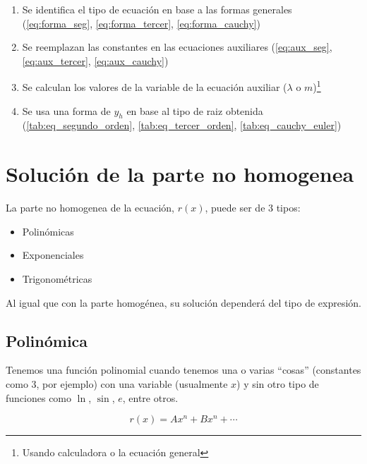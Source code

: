 \begin{enumerate}
    \item Se identifica el tipo de ecuación en base a las formas generales (\autoref{eq:forma_seg}, \autoref{eq:forma_tercer}, \autoref{eq:forma_cauchy})
    \item Se reemplazan las constantes en las ecuaciones auxiliares (\autoref{eq:aux_seg}, \autoref{eq:aux_tercer}, \autoref{eq:aux_cauchy})
    \item Se calculan los valores de la variable de la ecuación auxiliar ($\lambda$ o $m$)\footnote{Usando calculadora o la ecuación general}
    \item Se usa una forma de $y_{h}$ en base al tipo de raiz obtenida (\autoref{tab:eq_segundo_orden}, \autoref{tab:eq_tercer_orden}, \autoref{tab:eq_cauchy_euler})
\end{enumerate}


    \newpage %


\section{Solución de la parte no homogenea}

La parte no homogenea de la ecuación, $r(x)$, puede ser de 3 tipos:

\begin{itemize}
    \item Polinómicas
    \item Exponenciales
    \item Trigonométricas
\end{itemize}

Al igual que con la parte homogénea, su solución dependerá del tipo de expresión. 

\subsection{Polinómica}

Tenemos una función polinomial cuando tenemos una o varias ``cosas'' (constantes como 3, por ejemplo) con una variable (usualmente $x$) y sin otro tipo de funciones como $\ln$, $\sin$, $e$, entre otros.

\begin{equation}\label{eq:eq_polinomial}
    r(x) = Ax^{n} + Bx^{n} + \cdots
\end{equation}

    

